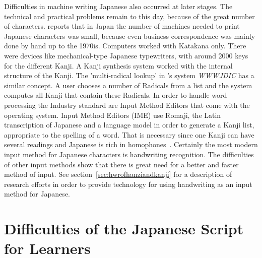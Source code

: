 Difficulties in machine writing Japanese also occurred at later stages. The 
technical and practical problems remain to this day, because of the great number
of characters.  reports that in Japan the number of 
machines needed to print Japanese characters was small, because even business
correspondence was mainly done by hand up to the 1970is. Computers worked with
Katakana only. There were devices like mechanical-type Japanese typewriters,
with around 2000 keys for the different Kanji. A Kanji synthesis system worked
with the internal structure of the Kanji. The 'multi-radical lookup' in 
's \citeyear{Breen2004} system \emph{WWWJDIC} has
a similar concept. A user chooses a number of Radicals from a list and the 
system computes all Kanji that contain these Radicals.
In order to handle word processing the Industry standard are Input Method Editors
that come with the operating system. Input Method Editors (IME) use 
Romaji, the Latin transcription of Japanese and a language model in order to
generate a Kanji list, appropriate to the spelling of a 
word. That is necessary since one Kanji can have several readings and Japanese
is rich in homophones~. 
Certainly the most modern input method for Japanese characters is handwriting
recognition. The difficulties of other input methods show that there is 
great need for a better and faster method of input. See 
section~\ref{sec:hwrofhanziandkanji} for a description of research 
efforts in order to provide technology for using handwriting as an input method 
for Japanese.

\section{Difficulties of the Japanese Script for Learners}
\label{sec:japanesedifficulties}


